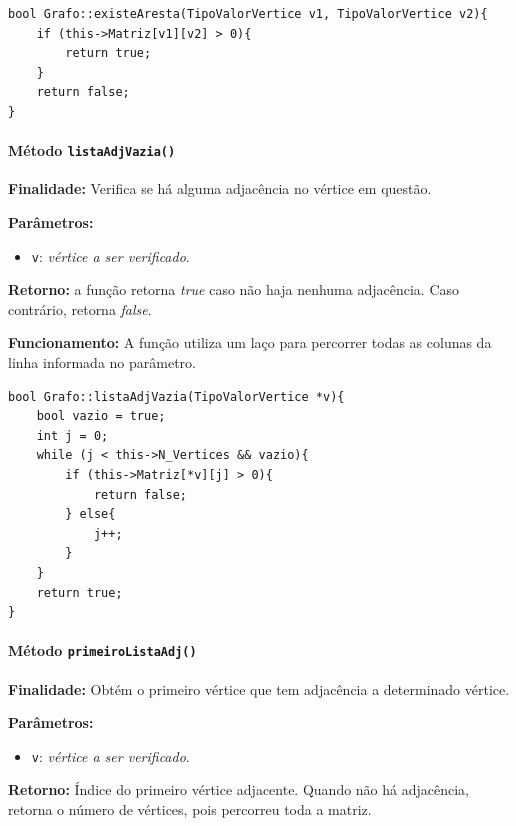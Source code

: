 \documentclass{article}
\begin{document}
\begin{verbatim}
bool Grafo::existeAresta(TipoValorVertice v1, TipoValorVertice v2){
    if (this->Matriz[v1][v2] > 0){
        return true;
    }
    return false;
}
\end{verbatim}
\paragraph{Método \texttt{listaAdjVazia()}}

    \mbox{}\par
    \noindent
    \textbf{Finalidade:} Verifica se há alguma adjacência no vértice em questão.

    \textbf{Parâmetros:}
    \begin{itemize}
        \item \texttt{v}: \textit{vértice a ser verificado}.
    \end{itemize}

    \textbf{Retorno:} a função retorna \textit{true} caso não haja nenhuma adjacência. Caso contrário, retorna \textit{false}.

    \textbf{Funcionamento:} A função utiliza um laço para percorrer todas as colunas da linha informada no parâmetro.

\begin{verbatim}
bool Grafo::listaAdjVazia(TipoValorVertice *v){
    bool vazio = true;
    int j = 0;
    while (j < this->N_Vertices && vazio){
        if (this->Matriz[*v][j] > 0){
            return false;
        } else{
            j++;
        }
    }
    return true;
}
\end{verbatim}
\paragraph{Método \texttt{primeiroListaAdj()}}

    \mbox{}\par
    \noindent
    \textbf{Finalidade:} Obtém o primeiro vértice que tem adjacência a determinado vértice.

    \textbf{Parâmetros:}
    \begin{itemize}
        \item \texttt{v}: \textit{vértice a ser verificado}.
    \end{itemize}

    \textbf{Retorno:} Índice do primeiro vértice adjacente. Quando não há adjacência, retorna o número de vértices, pois percorreu toda a matriz.
\end{document}
